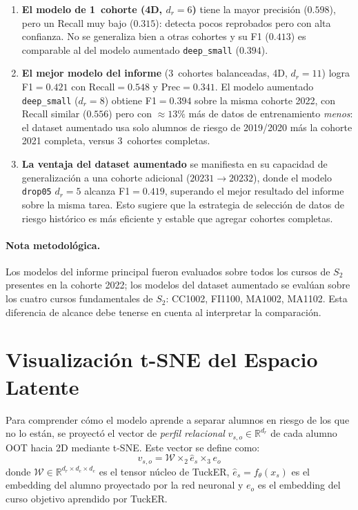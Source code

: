 \documentclass[11pt,a4paper]{article}
\begin{document}
\begin{enumerate}
    \item \textbf{El modelo de 1~cohorte (4D, $d_r=6$)} tiene la mayor precisión ($0.598$),
    pero un Recall muy bajo ($0.315$): detecta pocos reprobados pero con alta confianza.
    No se generaliza bien a otras cohortes y su F1 ($0.413$) es comparable al del modelo
    aumentado \texttt{deep\_small} ($0.394$).
    
    \item \textbf{El mejor modelo del informe} (3~cohortes balanceadas, 4D, $d_r=11$)
    logra F1$=0.421$ con Recall$=0.548$ y Prec$=0.341$. El modelo aumentado
    \texttt{deep\_small} ($d_r=8$) obtiene F1$=0.394$ sobre la misma cohorte 2022,
    con Recall similar ($0.556$) pero con $\approx 13\%$ más de datos de entrenamiento
    \emph{menos}: el dataset aumentado usa solo alumnos de riesgo de 2019/2020 más la
    cohorte 2021 completa, versus 3~cohortes completas.
    
    \item \textbf{La ventaja del dataset aumentado} se manifiesta en su capacidad de
    generalización a una cohorte adicional ($20231\to 20232$), donde el modelo
    \texttt{drop05} $d_r=5$ alcanza F1$=0.419$, superando el mejor resultado del informe
    sobre la misma tarea. Esto sugiere que la estrategia de selección de datos de riesgo
    histórico es más eficiente y estable que agregar cohortes completas.
\end{enumerate}

\paragraph{Nota metodológica.}
Los modelos del informe principal fueron evaluados sobre todos los cursos de $S_2$ presentes
en la cohorte 2022; los modelos del dataset aumentado se evalúan sobre los cuatro cursos
fundamentales de $S_2$: CC1002, FI1100, MA1002, MA1102. Esta diferencia de alcance debe
tenerse en cuenta al interpretar la comparación.

\section{Visualización t-SNE del Espacio Latente}

Para comprender cómo el modelo aprende a separar alumnos en riesgo de los que no lo están,
se proyectó el vector de \emph{perfil relacional} $v_{s,o} \in \mathbb{R}^{d_r}$ de cada
alumno OOT hacia 2D mediante t-SNE. Este vector se define como:
\[
v_{s,o} = \mathcal{W} \times_2 \hat{e}_s \times_3 e_o
\]
donde $\mathcal{W} \in \mathbb{R}^{d_r \times d_e \times d_e}$ es el tensor núcleo de TuckER,
$\hat{e}_s = f_\theta(x_s)$ es el embedding del alumno proyectado por la red neuronal y
$e_o$ es el embedding del curso objetivo aprendido por TuckER.
\end{document}
